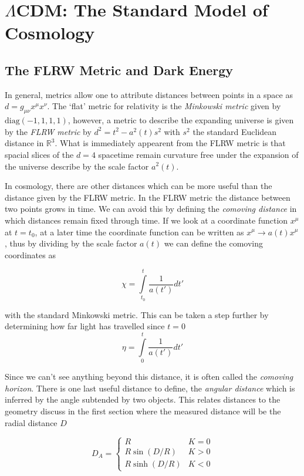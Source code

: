 \section{$\Lambda$CDM: The Standard Model of Cosmology}


\subsection{The FLRW Metric and Dark Energy}
In general, metrics allow one to attribute distances between points in a space as $d = g_{\mu\nu}x^\mu x^\nu$. 
The `flat' metric for relativity is the \textit{Minkowski metric} given by $\text{diag}(-1,1,1,1)$, however, a metric to describe the expanding universe is given by the \textit{FLRW metric} by $d^2 = t^2-a^2(t)s^2$ with $s^2$ the standard Euclidean distance in $\mathbb{R}^3$. 
What is immediately appearent from the FLRW metric is that spacial slices of the $d=4$ spacetime remain curvature free under the expansion of the universe describe by the scale factor $a^2(t)$.

In cosmology, there are other distances which can be more useful than the distance given by the FLRW metric. 
In the FLRW metric the distance between two points grows in time. 
We can avoid this by defining the \textit{comoving distance} in which distances remain fixed through time. 
If we look at a coordinate function $x^\mu$ at $t=t_0$, at a later time the coordinate function can be written as $x^\mu \rightarrow a(t) x^\mu$, thus by dividing by the scale factor $a(t)$ we can define the comoving coordinates as

\begin{equation}
    \chi = \int\limits^{t}_{t_0} \frac{1}{a(t')} dt'
\end{equation}

with the standard Minkowski metric. This can be taken a step further by determining how far light has travelled since $t=0$
\begin{equation}
    \eta = \int\limits^t_0 \frac{1}{a(t')}dt'
\end{equation}

Since we can't see anything beyond this distance, it is often called the \textit{comoving horizon}. 
There is one last useful distance to define, the \textit{angular distance} which is inferred by the angle subtended by two objects. 
This relates distances to the geometry discuss in the first section where the measured distance will be the radial distance $D$

\begin{equation}
    D_A = \left\{ \begin{array}{cc}
	    R & K=0 \\
	    R\sin(D/R) & K>0 \\
	    R\sinh(D/R) & K<0
    \end{array}
    \right.
\end{equation}

